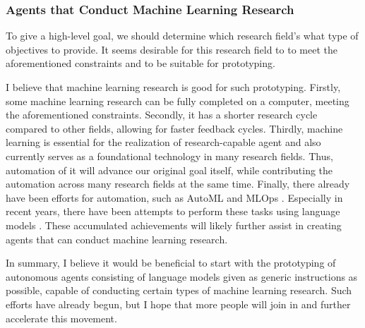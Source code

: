 

\subsubsection{Agents that Conduct Machine Learning Research}
To give a high-level goal, we should determine which research field's what type of objectives to provide. It seems desirable for this research field to to meet the aforementioned constraints and to be suitable for prototyping.

I believe that machine learning research is good for such prototyping. Firstly, some machine learning research can be fully completed on a computer, meeting the aforementioned constraints. Secondly, it has a shorter research cycle compared to other fields, allowing for faster feedback cycles. Thirdly, machine learning is essential for the realization of research-capable agent and also currently serves as a foundational technology in many research fields. Thus, automation of it will advance our original goal itself, while contributing the automation across many research fields at the same time. Finally, there already have been efforts for automation, such as AutoML \cite{hutter2019automated,bischl2023hyperparameter,lindauer2020best,white2023neural} and MLOps \cite{kreuzberger2023machine}. Especially in recent years, there have been attempts to perform these tasks using language models \cite{vijay2023prompt,zheng2023can}. These accumulated achievements will likely further assist in creating agents that can conduct machine learning research.

In summary, I believe it would be beneficial to start with the prototyping of autonomous agents consisting of language models given as generic instructions as possible, capable of conducting certain types of machine learning research. Such efforts have already begun, but I hope that more people will join in and further accelerate this movement.

